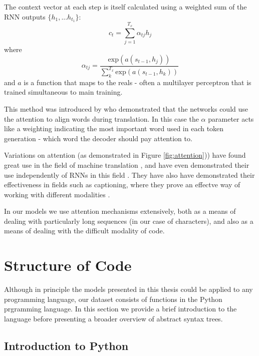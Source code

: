 The context vector at each step is itself calculated using a weighted sum of the RNN outputs $\{h_1,... h_{t_1}\}$:
\begin{equation}
c_t = \sum_{j=1}^{T_x}\alpha_{tj}h_j
\end{equation}
where
\begin{equation}
\alpha_{tj} = \dfrac{\text{exp}(a(s_{t-1}, h_j))}{\sum_k^{T_x}\text{exp}(a(s_{t-1}, h_k))}
\end{equation}
and $a$ is a function that maps to the reals - often a multilayer perceptron that is trained simultaneous to main training. 

This method was introduced by \citet{bahdanau_neural_2014} who demonstrated that the networks could use the attention to align words during translation.
In this case the $\alpha$ parameter acts like a weighting indicating the most important word used in each token generation - which word the decoder should pay attention to.

Variations on attention (as demonstrated in Figure \ref{fig:attention})) have found great use in the field of machine translation  \citep{luong_effective_2015}, and have even demonstrated their use independently of RNNs in this field \citep{vaswani_attention_2017}.  They have also have demonstrated their effectiveness in fields such as captioning, where they prove an effectve way of working with different modalities \citep{xu_show_2015}.

In our models we use attention mechanisms extensively, both as a means of dealing with particularly long sequences (in our case of characters), and also as a means of dealing with the difficult modality of code.




\section{Structure of Code} %
\label{sec:translating_code}

Although in principle the models presented in this thesis could be applied to any programming language, our dataset consists of functions in the Python prgramming language.  
In this section we provide a brief introduction to the language before presenting a broader overview of abstract syntax trees.

\subsection{Introduction to Python} %
\label{sub:python}

